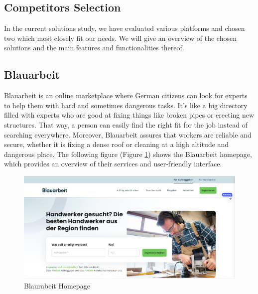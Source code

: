 \subsection{Competitors Selection}
In the current solutions study, we have evaluated various platforms and chosen two which most closely fit our needs. We will give an overview of the chosen solutions and the main features and functionalities thereof.

\subsection{Blauarbeit  \cite{Blauarbeit}}
Blauarbeit is an online marketplace where German citizens can look for experts to help them with hard and sometimes dangerous tasks. It's like a big directory filled with experts who are good at fixing things like broken pipes or erecting new structures. That way, a person can easily find the right fit for the job instead of searching everywhere. Moreover, Blauarbeit assures that workers are reliable and secure, whether it is fixing a dense roof or cleaning at a high altitude and dangerous place. The following figure (Figure \ref{fig:blaurabeit_image}) shows the Blauarbeit homepage, which provides an overview of their services and user-friendly interface.
\begin{figure}[H]
    \centering
    \includegraphics[width=\linewidth]{src/assets/chapters/Blaurabeit.PNG}
    \caption{Blaurabeit Homepage}
    \label{fig:blaurabeit_image}
\end{figure}


